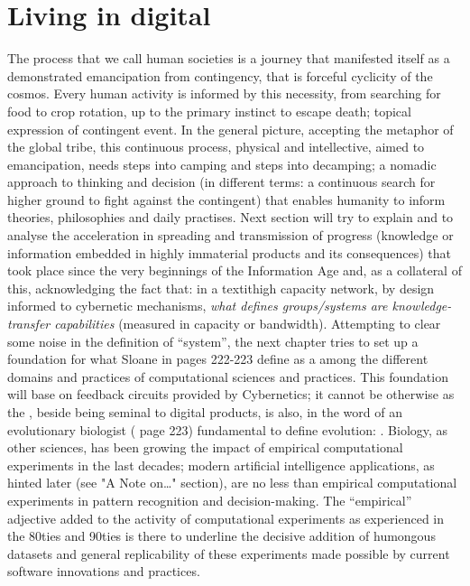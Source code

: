 \documentclass[14pt]{extarticle}
\begin{document}
\section*{Living in digital}%
\label{sec:digital}%

\hspace*{15mm}The process that we call human societies is a journey that manifested itself as a demonstrated emancipation from contingency, that is forceful cyclicity of the cosmos. Every human activity is informed by this necessity, from searching for food to crop rotation, up to the primary instinct to escape death; topical expression of contingent event.
\newline
In the general picture, accepting the metaphor of the global tribe, this continuous process, physical and intellective, aimed to emancipation, needs steps into camping and steps into decamping; a nomadic approach to thinking and decision (in different terms: a continuous search for higher ground to fight against the contingent) that enables humanity to inform theories, philosophies and daily practises.
\newline
\hspace*{15mm}Next section will try to explain and to analyse the acceleration in spreading and transmission of progress (knowledge or information embedded in highly immaterial products and its consequences) that took place since the very beginnings of the Information Age and, as a collateral of this, acknowledging the fact that: in a textit{high capacity network}, by design informed to cybernetic mechanisms, \textit{what defines groups/systems are knowledge-transfer capabilities} (measured in capacity or bandwidth). Attempting to clear some noise in the definition of “system”, the next chapter tries to set up a foundation for what Sloane in \cite{SLOANdarwin} pages 222-223 define as a  among the different domains and practices of computational sciences and practices. This foundation will base on feedback circuits provided by Cybernetics; it cannot be otherwise as the , beside being seminal to digital products, is also, in the word of an evolutionary biologist (\cite{SLOANdarwin} page 223) fundamental to define evolution: . Biology, as other sciences, has been growing the impact of empirical computational experiments in the last decades; modern artificial intelligence applications, as hinted later (see "A Note on…" section), are no less than empirical computational experiments in pattern recognition and decision-making. The “empirical” adjective added to the activity of computational experiments as experienced in the 80ties and 90ties is there to underline the decisive addition of humongous datasets and general replicability of these experiments made possible by current software innovations and practices.
\end{document}
